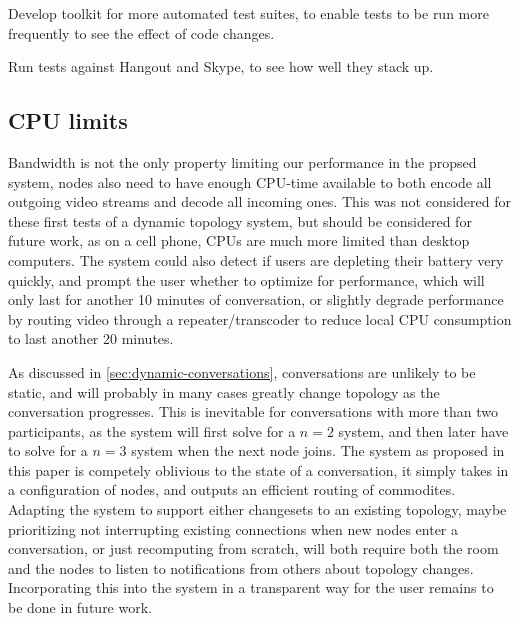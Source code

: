 Develop toolkit for more automated test suites, to enable tests to be run more frequently to see the effect of code changes.

Run tests against Hangout and Skype, to see how well they stack up.

\subsection{CPU limits}

Bandwidth is not the only property limiting our performance in the propsed system, nodes also need to have enough CPU-time available to both encode all outgoing video streams and decode all incoming ones. This was not considered for these first tests of a dynamic topology system, but should be considered for future work, as on a cell phone, CPUs are much more limited than desktop computers. The system could also detect if users are depleting their battery very quickly, and prompt the user whether to optimize for performance, which will only last for another 10 minutes of conversation, or slightly degrade performance by routing video through a repeater/transcoder to reduce local CPU consumption to last another 20 minutes.

As discussed in \autoref{sec:dynamic-conversations}, conversations are unlikely to be static, and will probably in many cases greatly change topology as the conversation progresses. This is inevitable for conversations with more than two participants, as the system will first solve for a $n=2$ system, and then later have to solve for a $n=3$ system when the next node joins. The system as proposed in this paper is competely oblivious to the state of a conversation, it simply takes in a configuration of nodes, and outputs an efficient routing of commodites. Adapting the system to support either changesets to an existing topology, maybe prioritizing not interrupting existing connections when new nodes enter a conversation, or just recomputing from scratch, will both require both the room and the nodes to listen to notifications from others about topology changes. Incorporating this into the system in a transparent way for the user remains to be done in future work.



